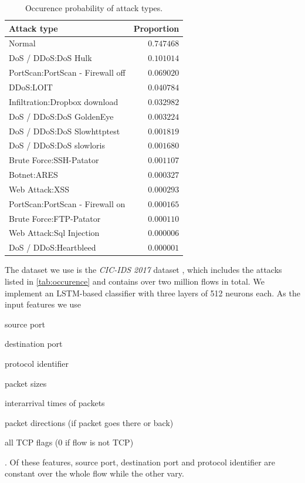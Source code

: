 \documentclass[sigconf,nonacm]{acmart}
\begin{document}
\begin{table}[b]
\caption{Occurence probability of attack types.} 
\begin{tabular}{l r} \toprule
Attack type & Proportion \\
\midrule
Normal                                                         & $0.747468$ \\
DoS / DDoS:DoS Hulk                                            & $0.101014$ \\
PortScan:PortScan - Firewall off                               & $0.069020$ \\
DDoS:LOIT                                                      & $0.040784$ \\
Infiltration:Dropbox download & $0.032982$ \\
DoS / DDoS:DoS GoldenEye                                       & $0.003224$ \\
DoS / DDoS:DoS Slowhttptest                                    & $0.001819$ \\
DoS / DDoS:DoS slowloris                                       & $0.001680$ \\
Brute Force:SSH-Patator                                        & $0.001107$ \\
Botnet:ARES                                                    & $0.000327$ \\
Web Attack:XSS                                                 & $0.000293$ \\
PortScan:PortScan - Firewall on                                & $0.000165$ \\
Brute Force:FTP-Patator                                        & $0.000110$ \\
Web Attack:Sql Injection                                       & $0.000006$ \\
DoS / DDoS:Heartbleed                                          & $0.000001$ \\
\bottomrule
\end{tabular}
\label{tab:occurence}
\end{table}

The dataset we use is the \textit{CIC-IDS 2017} dataset \cite{sharafaldin_toward_2018}, which includes the attacks listed in \autoref{tab:occurence} and contains over two million flows in total. We implement an LSTM-based classifier with three layers of 512 neurons each. As the input features we use \begin{itemize*}
\item source port
\item destination port
\item protocol identifier
\item packet sizes
\item interarrival times of packets
\item packet directions (if packet goes there or back)
\item all TCP flags (0 if flow is not TCP)
\end{itemize*}. Of these features, source port, destination port and protocol identifier are constant over the whole flow while the other vary. 
\end{document}
